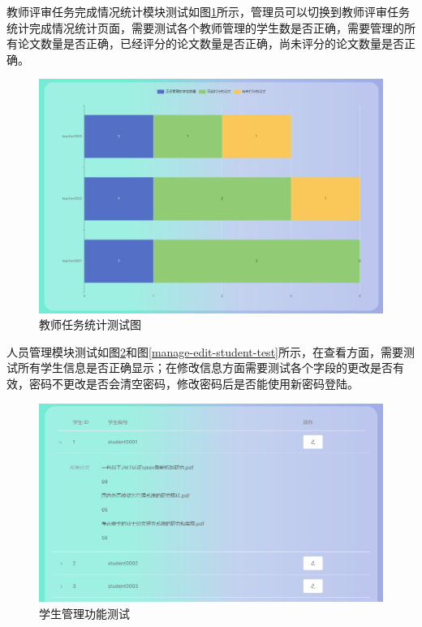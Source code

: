 教师评审任务完成情况统计模块测试如图\ref{statistic-teacher-task-test}所示，管理员可以切换到教师评审任务统计完成情况统计页面，需要测试各个教师管理的学生数是否正确，需要管理的所有论文数量是否正确，已经评分的论文数量是否正确，尚未评分的论文数量是否正确。

\begin{figure}[H]
  \centering
  \includegraphics[scale = 0.48]{out/figure/测试/statistic-teacher-task-test.png}
  \caption{\song\wuhao 教师任务统计测试图}
  \label{statistic-teacher-task-test}
\end{figure}

人员管理模块测试如图\ref{manage-students}和图\ref{manage-edit-student-test}所示，在查看方面，需要测试所有学生信息是否正确显示；在修改信息方面需要测试各个字段的更改是否有效，密码不更改是否会清空密码，修改密码后是否能使用新密码登陆。

\begin{figure}
  \centering
  \includegraphics[scale = 0.6]{out/figure/测试/manage-students.png}
  \caption{\song\wuhao 学生管理功能测试}
  \label{manage-students}
\end{figure}

